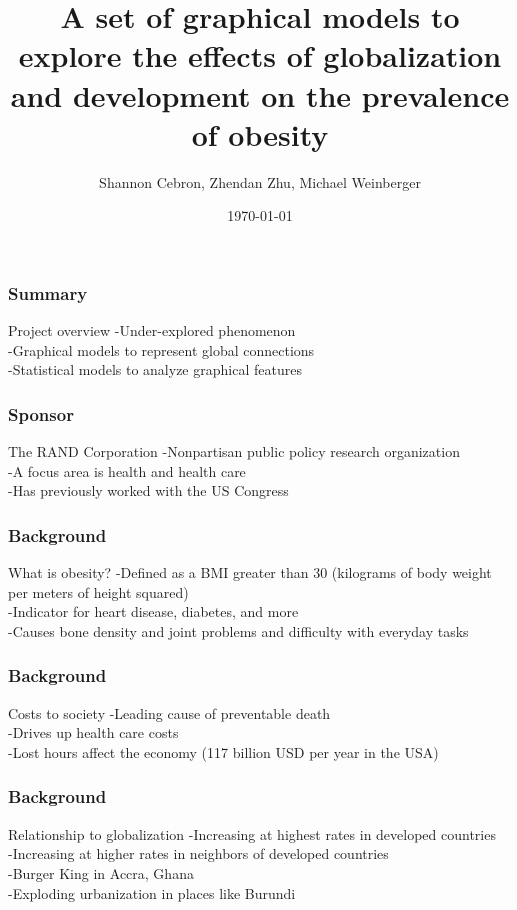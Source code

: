 \documentclass{beamer}
\title[Graphical models of obesity]{A set of graphical models to explore the effects of globalization and development on the prevalence of obesity}
\author{Shannon Cebron, Zhendan Zhu, Michael Weinberger}
\institute[Johns Hopkins University]
{
Johns Hopkins University \\
\medskip
{\emph{scebron@cis.jhu.edu, zzhu11@johnshopkins.edu, michael.lee.weinberger@gmail.com}}
}
\date{\today}
\begin{document}
%
\begin{frame}
\titlepage
\end{frame}
%
\begin{frame}
\frametitle{Summary}
\begin{block}
{Project overview}
-Under-explored phenomenon
\\
-Graphical models to represent global connections
\\
-Statistical models to analyze graphical features
\end{block}
\end{frame}
%
\begin{frame}
\frametitle{Sponsor}
\begin{block}
{The RAND Corporation}
-Nonpartisan public policy research organization
\\
-A focus area is health and health care
\\
-Has previously worked with the US Congress
\end{block}
\end{frame}
%

\begin{frame}
\frametitle{Background}
\begin{block}
{What is obesity?}
-Defined as a BMI greater than 30 (kilograms of body weight per meters of height squared)
\\
-Indicator for heart disease, diabetes, and more
\\
-Causes bone density and joint problems and difficulty with everyday tasks
\end{block}
\end{frame}

\begin{frame}
\frametitle{Background}
\begin{block}
{Costs to society}
-Leading cause of preventable death
\\
-Drives up health care costs
\\
-Lost hours affect the economy (117 billion USD per year in the USA)
\end{block}
\end{frame}

\begin{frame}
\frametitle{Background}
\begin{block}
{Relationship to globalization}
-Increasing at highest rates in developed countries
\\
-Increasing at higher rates in neighbors of developed countries
\\
-Burger King in Accra, Ghana
\\
-Exploding urbanization in places like Burundi
\end{block}
\end{frame}
\end{document}
